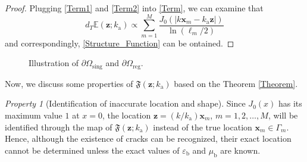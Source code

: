 \documentclass[a4,10pt]{article}
\newcommand{\ka}{k_{\mathrm{a}}}
\newcommand{\epsb}{\varepsilon_{\mathrm{b}}}
\newcommand{\mub}{\mu_{\mathrm{b}}}
\newcommand{\p}{\partial}
\newcommand{\mx}{\mathbf{x}}
\newcommand{\mz}{\mathbf{z}}
\DeclareMathOperator*{\sing}{sing}
\DeclareMathOperator*{\reg}{reg}
\theoremstyle{plain}
\theoremstyle{remark}
\newtheorem{property}{Property}[section]
\begin{document}
\begin{proof}
Plugging \eqref{Term1} and \eqref{Term2} into \eqref{Term}, we can examine that
\[d_T\mathbb{E}(\mz;\ka)\propto\sum_{m=1}^{M}\frac{J_0(|k\mx_m-\ka\mz|)}{\ln(\ell_m/2)}\]
and correspondingly, \eqref{Structure_Function} can be ontained.
\end{proof}

\begin{figure}[h]
\begin{center}
\caption{\label{Boundaries}Illustration of $\p\Omega_{\sing}$ and $\p\Omega_{\reg}$.}
\end{center}
\end{figure}

Now, we discuss some properties of $\mathfrak{F}(\mz;\ka)$ based on the Theorem \ref{Theorem}.

\begin{property}[Identification of inaccurate location and shape]\label{property1}
Since $J_0(x)$ has its maximum value $1$ at $x=0$, the location $\mz=(k/\ka)\mx_m$, $m=1,2,\ldots,M$, will be identified through the map of $\mathfrak{F}(\mz;\ka)$ instead of the true location $\mx_m\in\Gamma_m$. Hence, although the existence of cracks can be recognized, their exact location cannot be determined unless the exact values of $\epsb$ and $\mub$ are known.
\end{property}
\end{document}
